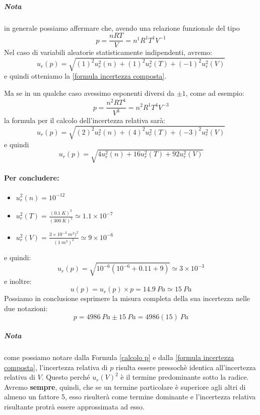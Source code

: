 \documentclass[a4paper,11pt]{report}
\begin{document}
\subparagraph*{Nota} in generale possiamo affermare che, avendo una relazione funzionale del tipo
$$
  p = \frac{nRT}{V} = n^1 R^1 T^1 V^{-1}
$$
Nel caso di variabili aleatorie statisticamente indipendenti, avremo:
$$
  u_r(p) = \sqrt{(1)^2u_r^2(n)+(1)^2u_r^2(T)+(-1)^2u_r^2(V)}
$$ e quindi otteniamo la \ref{formula incertezza composta}.

Ma se in un qualche caso avessimo esponenti diversi da $\pm 1$, come ad esempio:
$$
  p = \frac{n^2 R T^4}{V^3} = n^2 R^1 T^4 V^{-3}  
$$
la formula per il calcolo dell'incertezza relativa sarà:
$$
  u_r(p) = \sqrt{(2)^2u_r^2(n)+(4)^2u_r^2(T)+(-3)^2u_r^2(V)}
$$ e quindi
$$
  u_r(p) = \sqrt{4u_r^2(n)+16u_r^2(T)+92u_r^2(V)}  
$$
\paragraph{Per concludere:}
\begin{itemize}
  \item $u_r^2(n) = 10^{-12}$
  \item $u_r^2(T) = \frac{(0.1~K)^2}{(300~K)^2} \simeq 1.1\times 10^{-7}$
  \item $u_r^2(V) = \frac{3\times 10^{-3}~ m^3)^2}{(1~m^3)^2} \simeq 9\times 10^{-6}$
\end{itemize}
e quindi:
\begin{equation}
  \label{calcolo p}
  u_r(p) = \sqrt{10^{-6}(10^{-6}+0.11+9)} \simeq 3\times 10^{-3}
\end{equation}
e inoltre:
$$
  u(p) = u_r(p)\times p = 14.9~ Pa \simeq 15~Pa
$$
Possiamo in conclusione esprimere la misura completa della sua incertezza nelle due notazioni:
$$
  p = 4986~ Pa\pm 15~ Pa = 4986(15)~ Pa
$$
\subparagraph{Nota} come possiamo notare dalla Formula \ref{calcolo p} e dalla \ref{formula incertezza composta}, l'incertezza relativa di $p$ risulta essere pressochè identica all'incertezza relativa di $V$. Questo perché $u_r(V)^2$ è il termine predominante sotto la radice. Avremo \textbf{sempre}, quindi, che se un termine particolare è superiore agli altri di almeno un fattore 5, esso risulterà come termine dominante e l'incertezza relativa risultante protrà essere approssimata ad esso.
\end{document}
